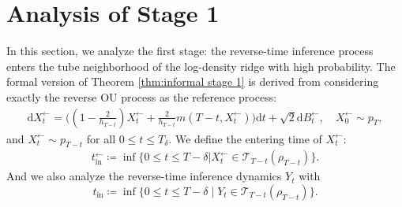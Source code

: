 \documentclass[11pt]{article}
\newcommand{\dee}{\mathrm{d}}
\newcommand{\mc}{\mathcal}
\newcommand{\tin}{t_{\mathrm{in}}}
\begin{document}
\section{Analysis of Stage 1}\label{append:stage 1}  In this section, we analyze the first stage: the reverse-time inference process enters the tube neighborhood of the log-density ridge with high probability. The formal version of Theorem \ref{thm:informal stage 1} is derived from considering exactly the reverse OU process as the reference process:
\begin{align*}
    \dee X_t^{\leftarrow} = \big( (1-\frac{2}{h_{T-t}})X_t^\leftarrow +\frac{2}{h_{T-t}}m(T-t,X_t^\leftarrow) \big) \dee t + \sqrt{2}\dee B_t^\leftarrow, \quad X_0^\leftarrow\sim p_T,
\end{align*}
and $X_t^\leftarrow\sim p_{T-t}$ for all $0\le t\le T_\delta$. We define the entering time of $X_t^\leftarrow$:
\begin{align*}
    \tin^\leftarrow \coloneqq \inf \{ 0\le t\le T-\delta | X_t^\leftarrow \in \mc{T}_{T-t}(\rho_{T-t}) \}.
\end{align*}
And we also analyze the reverse-time inference dynamics $Y_t$ with $$\tin \coloneqq \inf \{ 0\le t\le T-\delta \mid Y_t\in \mc{T}_{T-t}(\rho_{T-t}) \}.$$
\end{document}
